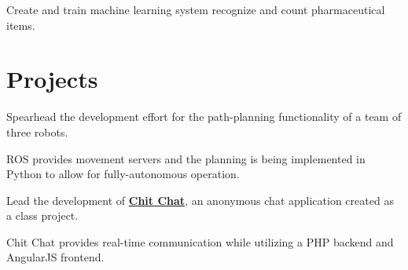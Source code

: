 \documentclass{deedy-resume-reversed}
\begin{document}
\begin{minipage}[t]{0.60\textwidth}
\begin{tightemize}
\item Create and train machine learning system recognize and count pharmaceutical items.
\end{tightemize}
\sectionsep


\section{Projects}
\begin{tightemize}
\item Spearhead the development effort for the path-planning functionality of a team of three robots.
\item ROS provides movement servers and the planning is being implemented in Python to allow for fully-autonomous operation.
\end{tightemize}
\sectionsep

\begin{tightemize}
\item Lead the development of \textbf{\href{https://github.com/user/repo}{Chit Chat}}, an anonymous chat application created as a class project.
\item Chit Chat provides real-time communication while utilizing a PHP backend and AngularJS frontend.
\end{tightemize}
\sectionsep




\end{minipage}
\end{document}
